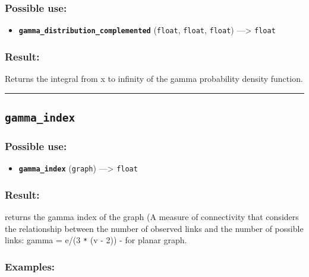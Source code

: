 \documentclass[]{book}
\providecommand{\tightlist}{%
  \setlength{\itemsep}{0pt}\setlength{\parskip}{0pt}}
\theoremstyle{definition}
\theoremstyle{definition}
\theoremstyle{definition}
\theoremstyle{remark}
\begin{document}
\subsubsection{Possible use:}\label{possible-use-182}

\begin{itemize}
\tightlist
\item
  \textbf{\texttt{gamma\_distribution\_complemented}} (\texttt{float},
  \texttt{float}, \texttt{float}) ---\textgreater{} \texttt{float}
\end{itemize}

\subsubsection{Result:}\label{result-176}

Returns the integral from x to infinity of the gamma probability density
function.

\begin{center}\rule{0.5\linewidth}{\linethickness}\end{center}

\subsection{\texorpdfstring{\texttt{gamma\_index}}{gamma\_index}}\label{gamma_index}

\subsubsection{Possible use:}\label{possible-use-183}

\begin{itemize}
\tightlist
\item
  \textbf{\texttt{gamma\_index}} (\texttt{graph}) ---\textgreater{}
  \texttt{float}
\end{itemize}

\subsubsection{Result:}\label{result-177}

returns the gamma index of the graph (A measure of connectivity that
considers the relationship between the number of observed links and the
number of possible links: gamma = e/(3 \texttt{*} (v - 2)) - for planar
graph.

\subsubsection{Examples:}\label{examples-133}
\end{document}

